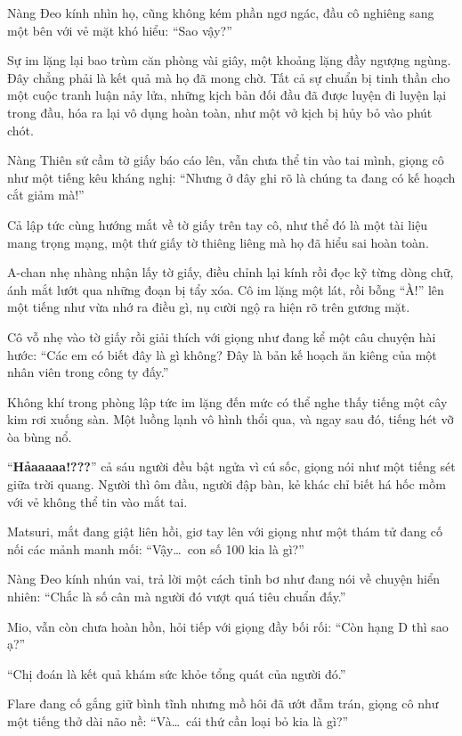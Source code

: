 \documentclass[../main.tex]{subfiles}
\begin{document}

Nàng Đeo kính nhìn họ, cũng không kém phần ngơ ngác, đầu cô nghiêng sang một bên với vẻ mặt khó hiểu: ``Sao vậy?''

Sự im lặng lại bao trùm căn phòng vài giây, một khoảng lặng đầy ngượng ngùng. Đây chẳng phải là kết quả mà họ đã mong chờ. Tất cả sự chuẩn bị tinh thần cho một cuộc tranh luận nảy lửa, những kịch bản đối đầu đã được luyện đi luyện lại trong đầu, hóa ra lại vô dụng hoàn toàn, như một vở kịch bị hủy bỏ vào phút chót.

Nàng Thiên sứ cầm tờ giấy báo cáo lên, vẫn chưa thể tin vào tai mình, giọng cô như một tiếng kêu kháng nghị: ``Nhưng ở đây ghi rõ là chúng ta đang có kế hoạch cắt giảm mà!''

Cả lập tức cùng hướng mắt về tờ giấy trên tay cô, như thể đó là một tài liệu mang trọng mạng, một thứ giấy tờ thiêng liêng mà họ đã hiểu sai hoàn toàn.

A-chan nhẹ nhàng nhận lấy tờ giấy, điều chỉnh lại kính rồi đọc kỹ từng dòng chữ, ánh mắt lướt qua những đoạn bị tẩy xóa. Cô im lặng một lát, rồi bỗng ``À!'' lên một tiếng như vừa nhớ ra điều gì, nụ cười ngộ ra hiện rõ trên gương mặt.

Cô vỗ nhẹ vào tờ giấy rồi giải thích với giọng như đang kể một câu chuyện hài hước: ``Các em có biết đây là gì không? Đây là bản kế hoạch ăn kiêng của một nhân viên trong công ty đấy.''

Không khí trong phòng lập tức im lặng đến mức có thể nghe thấy tiếng một cây kim rơi xuống sàn. Một luồng lạnh vô hình thổi qua, và ngay sau đó, tiếng hét vỡ òa bùng nổ.

``\textbf{Hảaaaaa!???}'' cả sáu người đều bật ngửa vì cú sốc, giọng nói như một tiếng sét giữa trời quang. Người thì ôm đầu, người đập bàn, kẻ khác chỉ biết há hốc mồm với vẻ không thể tin vào mắt tai.

Matsuri, mắt đang giật liên hồi, giơ tay lên với giọng như một thám tử đang cố nối các mảnh manh mối: ``Vậy\dots\ con số 100 kia là gì?''

Nàng Đeo kính nhún vai, trả lời một cách tỉnh bơ như đang nói về chuyện hiển nhiên: ``Chắc là số cân mà người đó vượt quá tiêu chuẩn đấy.''

Mio, vẫn còn chưa hoàn hồn, hỏi tiếp với giọng đầy bối rối: ``Còn hạng D thì sao ạ?''

``Chị đoán là kết quả khám sức khỏe tổng quát của người đó.''

Flare đang cố gắng giữ bình tĩnh nhưng mồ hôi đã ướt đẫm trán, giọng cô như một tiếng thở dài não nề: ``Và\dots\ cái thứ cần loại bỏ kia là gì?''
\end{document}
